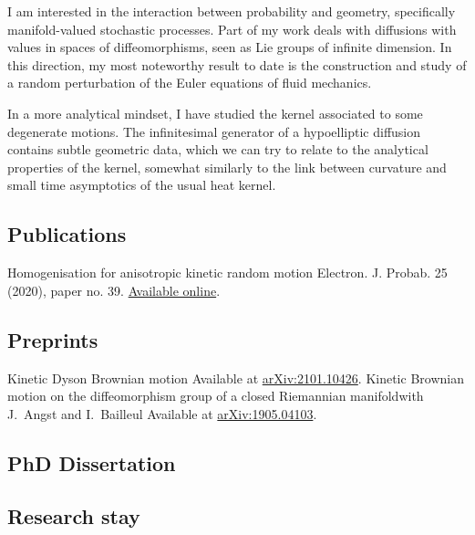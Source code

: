\documentclass[11pt,classic,colorlinks]{moderncv}
\begin{document}
\smallskip

I am interested in the interaction between probability and geometry, specifically manifold-valued stochastic processes. Part of my work deals with diffusions with values in spaces of diffeomorphisms, seen as Lie groups of infinite dimension. In this direction, my most noteworthy result to date is the construction and study of a random perturbation of the Euler equations of fluid mechanics.

\smallskip

In a more analytical mindset, I have studied the kernel associated to some degenerate motions. The infinitesimal generator of a hypoelliptic diffusion contains subtle geometric data, which we can try to relate to the analytical properties of the kernel, somewhat similarly to the link between curvature and small time asymptotics of the usual heat kernel.

\subsection{Publications}
   {Homogenisation for anisotropic kinetic random motion}{}{}{}
   {Electron. J. Probab. 25 (2020), paper no. 39. \href{https://projecteuclid.org/euclid.ejp/1585620094}{Available online}.}
\subsection{Preprints}
   {Kinetic Dyson Brownian motion}{}{}{}
   {Available at \href{https://arxiv.org/abs/2101.10426}{arXiv:2101.10426}.}
   {Kinetic Brownian motion on the diffeomorphism group of a closed Riemannian manifold}{with J.~Angst and I.~Bailleul}{}{}
   {Available at \href{https://arxiv.org/abs/1905.04103}{arXiv:1905.04103}.}
\subsection{PhD Dissertation}

\subsection{Research stay}
\end{document}
